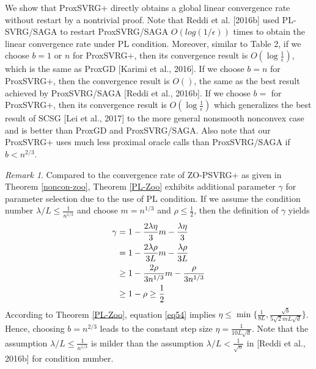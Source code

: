 \documentclass{article}
\theoremstyle{definition}
\theoremstyle{remark}
\newtheorem{remark}[theorem]{Remark}
\begin{document}
{\color{Violet}
We show that ProxSVRG+ directly obtains a global linear convergence rate without restart by a nontrivial proof. Note that Reddi et al. [2016b] used PL-SVRG/SAGA to restart ProxSVRG/SAGA $O(log(1/\epsilon))$ times to obtain
the linear convergence rate under PL condition.
Moreover, similar to Table 2, if we choose $b = 1$ or $n$ for ProxSVRG+, then its convergence result is $O(\log \frac{1}{\epsilon})$,
which is the same as ProxGD [Karimi et al., 2016]. If we choose $b = n$ for ProxSVRG+, then the convergence result is $O()$, the same as the best result achieved by ProxSVRG/SAGA [Reddi et al., 2016b]. If we
choose $b = $ for ProxSVRG+, then its convergence result is $O(\log\frac{1}{\epsilon})$
which generalizes the best result of SCSG [Lei et al., 2017] to the more general nonsmooth nonconvex case and is better than ProxGD and ProxSVRG/SAGA. Also note that our ProxSVRG+ uses much less proximal oracle calls than ProxSVRG/SAGA if $b < n ^{2/3}$.

}

\begin{remark}
Compared to the convergence rate of ZO-PSVRG+ as given in Theorem \ref{noncon-zoo}, Theorem \ref{PL-Zoo} exhibits additional parameter $\gamma$ for parameter selection due to the use of PL condition. 
If we assume the condition number $\lambda/L\leq \frac{1}{n^{1/3}}$ and choose $m = n^{1/3}$ and $\rho\leq \frac{1}{2}$, then the definition of $\gamma$ yields  
\begin{align}
\gamma &= 1-\frac{2\lambda\eta}{3} m-\frac{\lambda\eta}{3}\notag \\
& = 1 - \frac{2\lambda\rho}{3L}m - \frac{\lambda\rho}{3L}\notag\\
& \geq  1 - \frac{2\rho}{3n^{1/3}}m - \frac{\rho}{3n^{1/3}}\notag\\
& \geq  1 - \rho \geq \frac{1}{2}\label{eq54}
\end{align}
According to Theorem \ref{PL-Zoo}, equation \eqref{eq54} implies $\eta \leq \min\{\frac{1}{8L}, \frac{\sqrt{b}}{5\sqrt{2} m L \sqrt{d}}\}$. 
Hence, choosing $b = n^{2/3}$ leads to the constant step size  $\eta = \frac{1}{10 L \sqrt{d}}$.
Note that the assumption $\lambda/L \leq \frac{1}{{n}^{1/3}}$ is milder than the assumption $\lambda/L < \frac{1}{\sqrt{n}}$ in [Reddi et al., 2016b] for condition number.
\end{remark}
\end{document}
